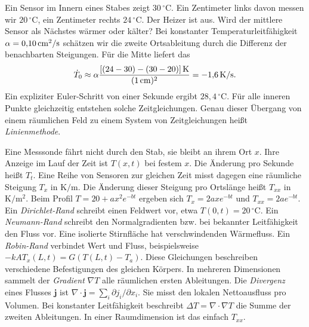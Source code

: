 Ein Sensor im Innern eines Stabes zeigt \(30\,^\circ\mathrm C\). Ein Zentimeter links davon messen wir \(20\,^\circ\mathrm C\), ein Zentimeter rechts \(24\,^\circ\mathrm C\). Der Heizer ist aus. Wird der mittlere Sensor als Nächstes wärmer oder kälter?
Bei konstanter Temperaturleitfähigkeit \(\alpha=0{,}10\,\mathrm{cm^2/s}\) schätzen wir die zweite Ortsableitung durch die Differenz der benachbarten Steigungen. Für die Mitte liefert das
\[
 \dot T_0\approx\alpha\frac{[(24-30)-(30-20)]\,\mathrm{K}}{(1\,\mathrm{cm})^2}
                 =-1{,}6\,\mathrm{K/s}.
\]
Ein expliziter Euler-Schritt von einer Sekunde ergibt \(28{,}4\,^\circ\mathrm C\). Für alle inneren Punkte gleichzeitig entstehen solche Zeitgleichungen. Genau dieser Übergang von einem räumlichen Feld zu einem System von Zeitgleichungen heißt \emph{Linienmethode}.


Eine Messsonde fährt nicht durch den Stab, sie bleibt an ihrem Ort \(x\). Ihre Anzeige im Lauf der Zeit ist \(T(x,t)\) bei festem \(x\). Die Änderung pro Sekunde heißt \(T_t\). Eine Reihe von Sensoren zur gleichen Zeit misst dagegen eine räumliche Steigung \(T_x\) in \(\mathrm{K/m}\). Die Änderung dieser Steigung pro Ortslänge heißt \(T_{xx}\) in \(\mathrm{K/m^2}\). Beim Profil \(T=20+ax^2e^{-bt}\) ergeben sich \(T_x=2ax e^{-bt}\) und \(T_{xx}=2ae^{-bt}\).
Ein \emph{Dirichlet-Rand} schreibt einen Feldwert vor, etwa \(T(0,t)=20\,^\circ\mathrm C\). Ein \emph{Neumann-Rand} schreibt den Normalgradienten bzw. bei bekannter Leitfähigkeit den Fluss vor. Eine isolierte Stirnfläche hat verschwindenden Wärmefluss. Ein \emph{Robin-Rand} verbindet Wert und Fluss, beispielsweise \(-kA T_x(L,t)=G(T(L,t)-T_a)\). Diese Gleichungen beschreiben verschiedene Befestigungen des gleichen Körpers.
In mehreren Dimensionen sammelt der \emph{Gradient} \(\nabla T\) alle räumlichen ersten Ableitungen. Die \emph{Divergenz} eines Flusses \(\mathbf j\) ist \(\nabla\cdot\mathbf j=\sum_i\partial j_i/\partial x_i\). Sie misst den lokalen Nettoausfluss pro Volumen. Bei konstanter Leitfähigkeit beschreibt \(\Delta T=\nabla\cdot\nabla T\) die Summe der zweiten Ableitungen. In einer Raumdimension ist das einfach \(T_{xx}\).

